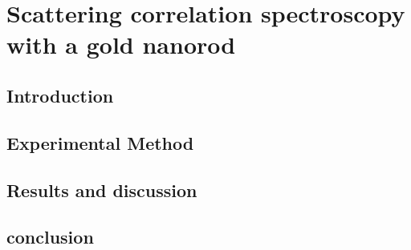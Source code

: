 \chapter{Scattering correlation spectroscopy with a gold nanorod}
\section{Introduction}
\section{Experimental Method}
\section{Results and discussion}
\section{conclusion}